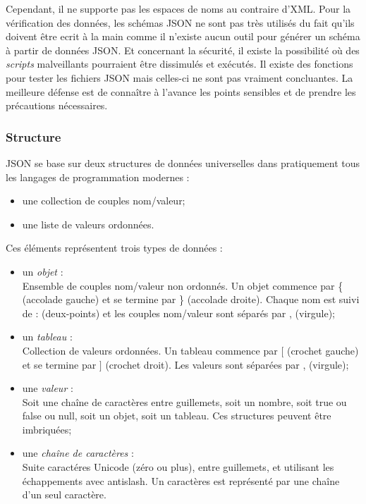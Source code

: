 Cependant, il ne supporte pas les espaces de noms au contraire d'XML.
Pour la v\'erification des donn\'ees, les sch\'emas JSON ne sont pas tr\`es utilis\'es du fait qu'ils doivent \^etre ecrit \`a la main comme il n'existe aucun outil pour g\'en\'erer un sch\'ema \`a partir de donn\'ees JSON.
Et concernant la s\'ecurit\'e, il existe la possibilit\'e o\`u des \textit{scripts} malveillants pourraient \^etre dissimul\'es et ex\'ecut\'es.
Il existe des fonctions pour tester les fichiers JSON mais celles-ci ne sont pas vraiment concluantes.
La meilleure d\'efense est de conna\^itre \`a l'avance les points sensibles et de prendre les pr\'ecautions n\'ecessaires.

\subsubsection{Structure}

JSON se base sur deux structures de donn\'ees universelles dans pratiquement tous les langages de programmation modernes :

\begin{itemize}
	\item une collection de couples nom/valeur;
	\item une liste de valeurs ordonn\'ees.

\end{itemize}

\vspace{0.20cm}

\noindent Ces \'el\'ements repr\'esentent trois types de donn\'ees :

\begin{itemize}
	\item un \textit{objet} :\\Ensemble de couples nom/valeur non ordonn\'es. Un objet commence par \textsf{\{ (accolade gauche)} et se termine par \textsf{\} (accolade droite)}.
	Chaque nom est suivi de \textsf{: (deux-points)} et les couples nom/valeur sont s\'epar\'es par \textsf{, (virgule)};
	\item un \textit{tableau} :\\Collection de valeurs ordonn\'ees. Un tableau commence par \textsf{$[$ (crochet gauche)} et se termine par \textsf{$]$ (crochet droit)}.
	Les valeurs sont s\'epar\'ees par \textsf{, (virgule)};
	\item une \textit{valeur} :\\Soit une \textsf{cha\^ine de caract\`eres} entre guillemets, soit un \textsf{nombre}, soit \textsf{true} ou \textsf{false} ou \textsf{null}, soit un \textsf{objet}, soit un \textsf{tableau}.
	Ces structures peuvent \^etre imbriqu\'ees;
	\item une \textit{cha\^ine de caract\`eres} :\\Suite caract\'eres Unicode (z\'ero ou plus), entre guillemets, et utilisant les \'echappements avec antislash. 
	Un caract\`eres est repr\'esent\'e par une cha\^ine d'un seul caract\`ere.

\end{itemize}

